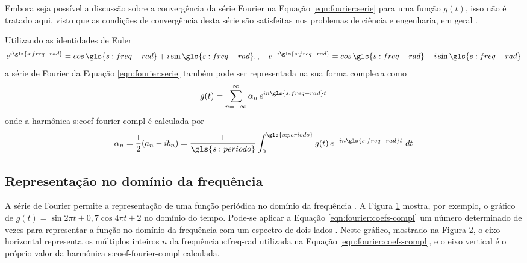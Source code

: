 \documentclass[12pt,oneside,english,brazil,lmodern,siglas,simbolos,cite=num]{ucsmonograph}
\begin{document}
	Embora seja possível a discussão sobre a convergência da série Fourier na Equação \ref{eqn:fourier:serie} para uma função $g(t)$, isso não é tratado aqui, visto que as condições de convergência desta série são satisfeitas nos problemas de ciência e engenharia, em geral \cite{spiegel:1977}.
	
	Utilizando as identidades de Euler
	\begin{equation}\label{eqn:fourier:ident-euler}
		e^{i\gls{s:freq-rad}} = cos\,\gls{s:freq-rad} + i\sin\gls{s:freq-rad}, , \quad e^{-i\gls{s:freq-rad}} = cos\,\gls{s:freq-rad} - i\sin\gls{s:freq-rad}
	\end{equation}
	a série de Fourier da Equação \ref{eqn:fourier:serie} também pode ser representada na sua forma complexa como \cite{spiegel:1977}
	\begin{equation}\label{eqn:fourier:serie-compl}
		g(t) = \sum_{n=-\infty}^{\infty}\alpha_n\,e^{in\gls{s:freq-rad} t}
	\end{equation}
	onde a harmônica \gls{s:coef-fourier-compl} é calculada por \cite{dimarogonas:1995}
	\begin{equation}\label{eqn:fourier:coefs-compl}
		\alpha_n = \frac{1}{2}(a_n - ib_n) = \frac{1}{\gls{s:periodo}}\int_{0}^{\gls{s:periodo}}g(t)\,e^{-in\gls{s:freq-rad} t}\ dt
	\end{equation}
	
	\subsection{Representação no domínio da frequência} \label{sec:espectros-frequencia}
	A série de Fourier permite a representação de uma função periódica no domínio da frequência \cite{rao:2008}.
	A Figura \ref{fig:funcao-periodica} mostra, por exemplo, o gráfico de $ g(t) = \sin2\pi t + 0,\!7\cos4\pi t + 2 $ no domínio do tempo.
	Pode-se aplicar a Equação \ref{eqn:fourier:coefs-compl} um número determinado de vezes para representar a função no domínio da frequência com um espectro de dois lados \cite{dimarogonas:1995}.
	Neste gráfico, mostrado na Figura \ref{fig:espectro-2sided}, o eixo horizontal representa os múltiplos inteiros $ n $ da frequência \gls{s:freq-rad} utilizada na Equação \ref{eqn:fourier:coefs-compl}, e o eixo vertical é o próprio valor da harmônica \gls{s:coef-fourier-compl} calculada.
	\begin{figure}[b]
		\label{fig:funcao-periodica}
	\end{figure}
	\begin{figure}[t]
		\label{fig:espectro-2sided}
	\end{figure}
	
\end{document}
